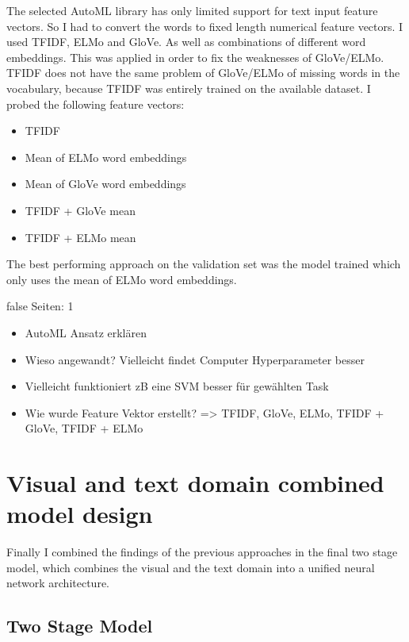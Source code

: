 \documentclass[draft,final,oneside]{vutinfth} %
\begin{document}
The selected AutoML library has only limited support for text input feature vectors. So I had to convert the words to fixed length numerical feature vectors. I used TFIDF, ELMo and GloVe. As well as combinations of different word embeddings. This was applied in order to fix the weaknesses of GloVe/ELMo. TFIDF does not have the same problem of GloVe/ELMo of missing words in the vocabulary, because TFIDF was entirely trained on the available dataset. I probed the following feature vectors:

\begin{itemize}

\item TFIDF
\item Mean of ELMo word embeddings
\item Mean of GloVe word embeddings
\item TFIDF + GloVe mean
\item TFIDF + ELMo mean

\end{itemize}

The best performing approach on the validation set was the model trained which only uses the mean of ELMo word embeddings.

\if false
Seiten: 1

\begin{itemize}
\item AutoML Ansatz erklären
\item Wieso angewandt? Vielleicht findet Computer Hyperparameter besser
\item Vielleicht funktioniert zB eine SVM besser für gewählten Task
\item Wie wurde Feature Vektor erstellt? => TFIDF, GloVe, ELMo, TFIDF + GloVe, TFIDF + ELMo
\end{itemize}
\fi

\section{Visual and text domain combined model design}

Finally I combined the findings of the previous approaches in the final two stage model, which combines the visual and the text domain into a unified neural network architecture.

\subsection{Two Stage Model}
\end{document}
